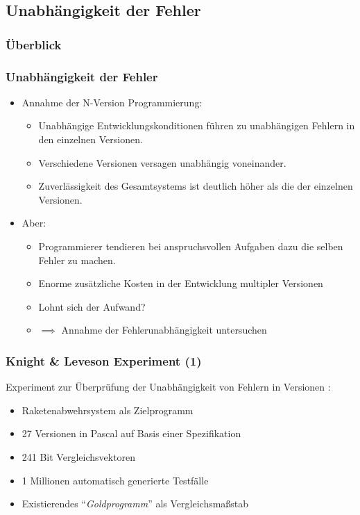 \subsection{Unabhängigkeit der Fehler}
%
\begin{frame}
	\frametitle{Überblick}
	\tableofcontents[currentsubsection]
\end{frame}
%
\begin{frame}
	\frametitle{Unabhängigkeit der Fehler}
	\begin{itemize}
		\item Annahme der N-Version Programmierung:
			\begin{itemize}
				\item Unabhängige Entwicklungskonditionen führen zu unabhängigen Fehlern in den einzelnen Versionen.
				\item Verschiedene Versionen versagen unabhängig voneinander.
				\item Zuverlässigkeit des Gesamtsystems ist deutlich höher als die der einzelnen Versionen.
			\end{itemize}
			\pause
			\item Aber:
			\begin{itemize}
				\item Programmierer tendieren bei anspruchsvollen Aufgaben dazu die selben Fehler zu machen.
				\item Enorme zusätzliche Kosten in der Entwicklung multipler Versionen
				\item Lohnt sich der Aufwand?
				\item $\implies$ Annahme der Fehlerunabhängigkeit untersuchen
			\end{itemize}
		
	\end{itemize}
	
\end{frame}
%
%
\begin{frame}
	\frametitle{Knight \& Leveson Experiment (1)}

	 Experiment zur Überprüfung der Unabhängigkeit von Fehlern in Versionen \cite{Knight:1986:EEA:10677.10688}:
		\begin{itemize}
			\item Raketenabwehrsystem als Zielprogramm
			\item 27 Versionen in Pascal auf Basis einer Spezifikation
			\item 241 Bit Vergleichsvektoren
			\item 1 Millionen automatisch generierte Testfälle
			\item Existierendes \enquote{\emph{Goldprogramm}} als Vergleichsmaßstab
		\end{itemize}

\end{frame}
